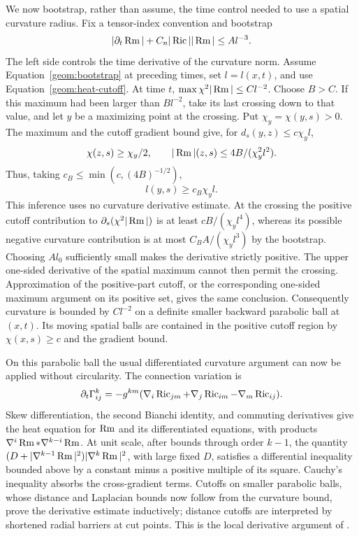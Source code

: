 We now bootstrap, rather than assume, the time control needed to use
a spatial curvature radius. Fix a tensor-index convention and
bootstrap
\begin{equation}\label{geom:bootstrap}
 |\partial_t\operatorname{Rm}|+C_n|\operatorname{Ric}||\operatorname{Rm}|\leq A l^{-3}.
\end{equation}
The left side controls the time derivative of the curvature norm.
Assume Equation~\eqref{geom:bootstrap} at preceding times, set
$l=l(x,t)$, and use Equation~\eqref{geom:heat-cutoff}. At time $t$,
$\max\chi^2|\operatorname{Rm}|\leq C l^{-2}$. Choose $B>C$. If this maximum
had been larger than $Bl^{-2}$, take its last crossing down to that
value, and let $y$ be a maximizing point at the crossing. Put
$\chi_y=\chi(y,s)>0$. The maximum and the cutoff gradient bound give,
for $d_s(y,z)\leq c\chi_y l$,
\[
 \chi(z,s)\geq\chi_y/2,\qquad
 |\operatorname{Rm}|(z,s)\leq4B/(\chi_y^2 l^2).
\]
Thus, taking $c_B\leq\min(c,(4B)^{-1/2})$,
\begin{equation}\label{geom:no-circularity}
 l(y,s)\geq c_B\chi_y l.
\end{equation}
This inference uses no curvature derivative estimate. At the crossing
the positive cutoff contribution to $\partial_s(\chi^2|\operatorname{Rm}|)$ is
at least $cB/(\chi_y l^4)$, whereas its possible negative curvature
contribution is at most $C_BA/(\chi_y l^3)$ by the bootstrap.
Choosing $A l_0$ sufficiently small makes the derivative strictly
positive. The upper one-sided derivative of the spatial maximum
cannot then permit the crossing. Approximation of the positive-part
cutoff, or the corresponding one-sided maximum argument on its
positive set, gives the same conclusion. Consequently curvature is
bounded by $Cl^{-2}$ on a definite smaller backward parabolic ball
at $(x,t)$. Its moving spatial balls are contained in the positive
cutoff region by $\chi(x,s)\geq c$ and the gradient bound.

On this parabolic ball the usual differentiated curvature argument
can now be applied without circularity. The connection variation is
\[
 \partial_t\Gamma^k_{ij}
 =-g^{km}(\nabla_i\operatorname{Ric}_{jm}+\nabla_j\operatorname{Ric}_{im}-\nabla_m\operatorname{Ric}_{ij}).
\]
Skew differentiation, the second Bianchi identity, and commuting
derivatives give the heat equation for $\operatorname{Rm}$ and its differentiated
equations, with products
$\nabla^i\operatorname{Rm}*\nabla^{k-i}\operatorname{Rm}$. At unit scale, after bounds through
order $k-1$, the quantity
$(D+|\nabla^{k-1}\operatorname{Rm}|^2)|\nabla^k\operatorname{Rm}|^2$, with large fixed $D$,
satisfies a differential inequality bounded above by a constant minus
a positive multiple of its square. Cauchy's inequality absorbs the
cross-gradient terms. Cutoffs on smaller parabolic balls, whose
distance and Laplacian bounds now follow from the curvature bound,
prove the derivative estimate inductively; distance cutoffs are
interpreted by shortened radial barriers at cut points. This is the
local derivative argument of \cite{Shi1989}.

